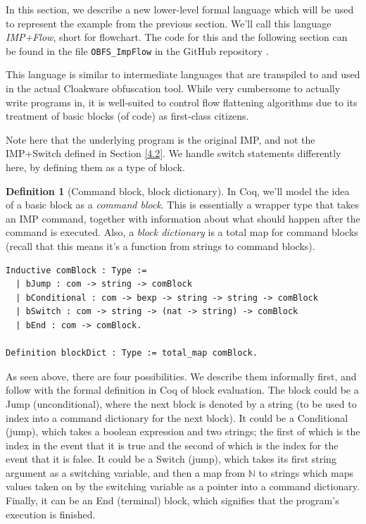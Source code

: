 \documentclass[12pt,notitlepage]{report}
\theoremstyle{plain}
\theoremstyle{definition}
\newtheorem{defin}[theo]{Definition}
\newcommand\N{\mathbb{N}}
\newcommand{\define}[1]{\emph{#1}\index{#1}}
\numberwithin{equation}{section}
\begin{document}
In this section, we describe a new lower-level formal language which will be used to represent the example from the previous section.  We'll call this language \emph{IMP+Flow}, short for flowchart.  The code for this and the following section can be found in the file \verb$OBFS_ImpFlow$ in the GitHub repository \cite{repo}.

\par This language is similar to intermediate languages that are transpiled to and used in the actual Cloakware obfuscation tool.  While very cumbersome to actually write programs in, it is well-suited to control flow flattening algorithms due to its treatment of basic blocks (of code) as first-class citizens.

\par Note here that the underlying program is the original IMP, and not the IMP+Switch defined in Section \ref{4.2}.  We handle switch statements differently here, by defining them as a type of block.

\begin{defin}[Command block, block dictionary]
In Coq, we'll model the idea of a basic block as a \define{command block}.  This is essentially a wrapper type that takes an IMP command, together with information about what should happen after the command is executed.  Also, a \define{block dictionary} is a total map for command blocks (recall that this means it's a function from strings to command blocks).

\begin{verbatim}
Inductive comBlock : Type :=
  | bJump : com -> string -> comBlock
  | bConditional : com -> bexp -> string -> string -> comBlock
  | bSwitch : com -> string -> (nat -> string) -> comBlock
  | bEnd : com -> comBlock.

Definition blockDict : Type := total_map comBlock.
\end{verbatim}
\end{defin}

\par As seen above, there are four possibilities.  We describe them informally first, and follow with the formal definition in Coq of block evaluation.  The block could be a Jump (unconditional), where the next block is denoted by a string (to be used to index into a command dictionary for the next block).  It could be a Conditional (jump), which takes a boolean expression and two strings; the first of which is the index in the event that it is true and the second of which is the index for the event that it is false.  It could be a Switch (jump), which takes its first string argument as a switching variable, and then a map from $\N$ to strings which maps values taken on by the switching variable as a pointer into a command dictionary.  Finally, it can be an End (terminal) block, which signifies that the program's execution is finished. 
\end{document}
